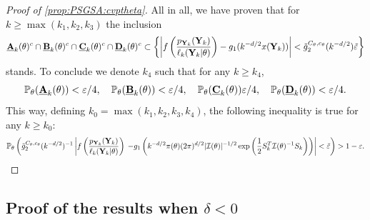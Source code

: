 \begin{proof}[Proof of \cref{prop:PSGSA:cvptheta}]
All in all, we have proven that for $k\geq\max(k_1,k_2,k_3)$ the inclusion
    \begin{equation}
         \underline{\mathbf{A}}_k(\theta)^c\cap \underline{\mathbf{B}}_k(\theta)^c\cap \underline{\mathbf{C}}_k(\theta)^c\cap \underline{\mathbf{D}}_k(\theta)^c \subset \left\{ \left|f\left(\frac{p_{\mathbf{Y}_k}(\mathbf{Y}_k)}{\ell_k(\mathbf{Y}_k|\theta)} \right) - g_1(k^{-d/2} x(\mathbf{Y}_k)) \right| < \tilde g_2^{C_\theta,c_\theta}(k^{-d/2}) \tilde{\varepsilon}  \right\}
    \end{equation}
stands.
To conclude we denote $k_4$ such that for any $k\geq k_4$,
        \begin{equation}
            \mathbb{P}_\theta(\underline{\mathbf{A}}_k(\theta)) <\varepsilon/4,\quad\mathbb{P}_\theta(\underline{\mathbf{B}}_k(\theta))<\varepsilon/4, \quad\mathbb{P}_\theta(\underline{\mathbf{C}}_k(\theta))\varepsilon/4, \quad \mathbb{P}_\theta(\underline{\mathbf{D}}_k(\theta))<\varepsilon/4.
        \end{equation}
This way, defining $k_0=\max(k_1,k_2,k_3,k_4)$, the following inequality is true for any $k\geq k_0$:
\begin{equation}
    \mathbb{P}_\theta\left(\tilde g_2^{C_\theta,c_\theta}(k^{-d/2})^{-1}\left| f\left(\frac{p_{\mathbf{Y}_k}(\mathbf{Y}_k)}{\ell_k(\mathbf{Y}_k|\theta)}\right) \right.            \left. - g_1\left(k^{-d/2}\pi(\theta)(2\pi)^{d/2}|\mathcal{I}(\theta)|^{-1/2}\exp\left(\frac{1}{2}S_k^T\mathcal{I}(\theta)^{-1}S_k \right)\right) \right|<\tilde{\varepsilon}   \right)>1-\varepsilon.
\end{equation}
\end{proof}


\newcommand{\ubf}[1]{\underline{\mbf{#1}}}


\subsection{Proof of the results when $\delta<0$} %

